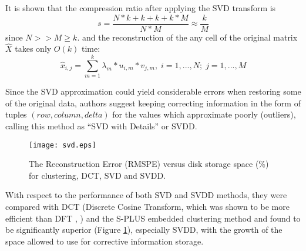 It is shown that the compression ratio after applying the SVD transform is 
\begin{equation}
s = \frac{N*k + k + k + k*M}{N*M} \approx \frac{k}{M}
\label{eq:svd_compression}
\end{equation}
since $N >> M \geq k$. and the reconstruction of the any cell of the original matrix $\hat{X}$ takes only $O(k)$ time:
\begin{equation}
\hat{x}_{i,j}  = \sum_{m=1}^{k} \lambda_{m} * u_{i,m} * v_{j,m},\; i=1,...,N;\; j=1,...,M
\label{eq:svd_reconstruct}
\end{equation}

Since the SVD approximation could yield considerable errors when restoring some of the original data, authors suggest keeping correcting information in the form of tuples $(row,column,delta)$ for the values which approximate poorly (outliers), calling this method as ``SVD with Details'' or SVDD. 

\begin{figure}[tbp]
   \centering
   \texttt{[image: svd.eps]}
   \caption{The Reconstruction Error (RMSPE) versus disk storage space (\%) for clustering, DCT, SVD and SVDD.}
   \label{fig:svd_benchmark}
\end{figure} 

With respect to the performance of both SVD and SVDD methods, they were compared with DCT (Discrete Cosine Transform, which was shown to be more efficient than DFT \cite{citeulike:4303331}, \cite{citeulike:4501572}) and the S-PLUS embedded clustering method and found to be significantly superior (Figure  \ref{fig:svd_benchmark}), especially SVDD, with the growth of the space allowed to use for corrective information storage.